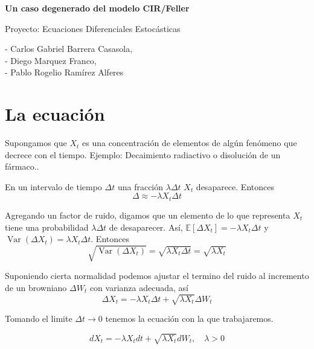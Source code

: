 \documentclass[12pt]{article}
\title{\mytitle}
\author{\myname}
\newcommand{\myname}{- Carlos Gabriel Barrera Casasola,\\ - Diego Marquez Franco,\\ - Pablo Rogelio Ramírez Alferes}
\newcommand{\myclass}{Un caso degenerado del modelo CIR/Feller}
\newcommand{\mytitle}{Proyecto: Ecuaciones Diferenciales Estocásticas}
\begin{document}
	\begin{titlepage}
		\centering
		\vspace*{3cm}
		
		{\Huge \bfseries \myclass \par}
		\vspace{2cm}
		
		{\Large \mytitle \par}
		\vspace{4cm}
		
		{\large \myname \par}
		\vspace{0.5cm}
		
		{\large \DTMtoday \par}
		
		\vfill
		
	\end{titlepage}
	


\section*{La ecuación}
Supongamos que $X_t$ es una concentración de elementos de algún fenómeno que decrece con el tiempo. Ejemplo: Decaimiento radiactivo o disolución de un fármaco..

En un intervalo de tiempo $\Delta t$ una fracción $\lambda \Delta t$ $X_t$ desaparece. 
Entonces $$\Delta \approx -\lambda X_t \Delta t$$

Agregando un factor de ruido, digamos que un elemento de lo que representa $X_t$ tiene una probabilidad $\lambda \Delta t$ de desaparecer. Así, $\mathbb{E}[\Delta X_t] = -\lambda X_t \Delta t $ y $\operatorname{Var}(\Delta X_t) = \lambda X_t \Delta t.$
Entonces  $$\sqrt{\operatorname{Var}(\Delta X_t)} =  \sqrt{\lambda X_t \Delta t} = \sqrt{\lambda X_t}$$

Suponiendo cierta normalidad podemos ajustar el termino del ruido al incremento de un browniano $\Delta W_t$ con varianza adecuada, así
$$\Delta X_t = - \lambda X_t \Delta t + \sqrt{ \lambda X_t} \Delta W_t$$

Tomando el limite $\Delta t \to 0$ tenemos la ecuación con la que trabajaremos.

\begin{equation}
	dX_t = -\lambda X_t dt + \sqrt{\lambda X_t } dW_t, \quad \lambda >0
	\label{eq:mainEq}
\end{equation}
\end{document}
